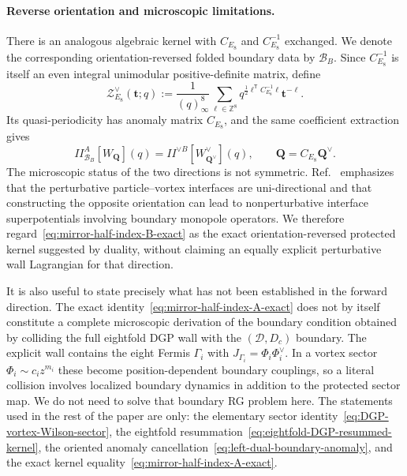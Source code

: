 \documentclass[11pt,a4paper]{article}
\numberwithin{equation}{section}
\begin{document}
\paragraph{Reverse orientation and microscopic limitations.}
There is an analogous algebraic kernel with $C_{E_8}$ and $C_{E_8}^{-1}$ exchanged.  We denote the corresponding orientation-reversed folded boundary data by $\mathcal B_B$.  Since $C_{E_8}^{-1}$ is itself an even integral unimodular positive-definite matrix, define
\begin{equation}
  \mathcal Z_{E_8}^{\vee}(\boldsymbol t;q)
  :=
  \frac{1}{(q)_\infty^8}
  \sum_{\boldsymbol\ell\in\mathbb Z^8}
  q^{\frac12\boldsymbol\ell^{\mathsf T}C_{E_8}^{-1}\boldsymbol\ell}
  \boldsymbol t^{-\boldsymbol\ell}.
  \label{eq:dual-E8-edge-refined-character}
\end{equation}
Its quasi-periodicity has anomaly matrix $C_{E_8}$, and the same coefficient extraction gives
\begin{equation}
  I\!\!I_{\mathcal B_B}^{A}
  [W_{\boldsymbol Q}](q)
  =I\!\!I^{\vee B}[W^\vee_{\boldsymbol Q^\vee}](q),
  \qquad
  \boldsymbol Q=C_{E_8}\boldsymbol Q^\vee.
  \label{eq:mirror-half-index-B-exact}
\end{equation}
The microscopic status of the two directions is not symmetric.  Ref.~\cite{Dimofte:2017tpi} emphasizes that the perturbative particle--vortex interfaces are uni-directional and that constructing the opposite orientation can lead to nonperturbative interface superpotentials involving boundary monopole operators.  We therefore regard~\eqref{eq:mirror-half-index-B-exact} as the exact orientation-reversed protected kernel suggested by duality, without claiming an equally explicit perturbative wall Lagrangian for that direction.

It is also useful to state precisely what has not been established in the forward direction.  The exact identity~\eqref{eq:mirror-half-index-A-exact} does not by itself constitute a complete microscopic derivation of the boundary condition obtained by colliding the full eightfold DGP wall with the $(\mathcal D,D_c)$ boundary.  The explicit wall contains the eight Fermis $\Gamma_i$ with $J_{\Gamma_i}=\Phi_i\Phi_i^\vee$.  In a vortex sector $\Phi_i\sim c_i z^{m_i}$ these become position-dependent boundary couplings, so a literal collision involves localized boundary dynamics in addition to the protected sector map.  We do not need to solve that boundary RG problem here.  The statements used in the rest of the paper are only: the elementary sector identity~\eqref{eq:DGP-vortex-Wilson-sector}, the eightfold resummation~\eqref{eq:eightfold-DGP-resummed-kernel}, the oriented anomaly cancellation~\eqref{eq:left-dual-boundary-anomaly}, and the exact kernel equality~\eqref{eq:mirror-half-index-A-exact}.
\end{document}
